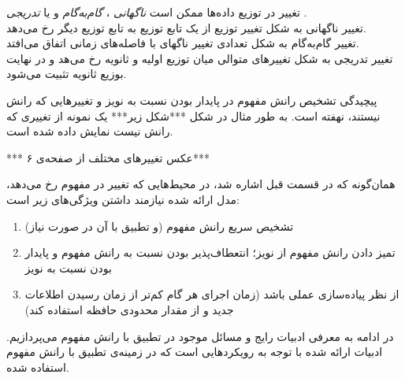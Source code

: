 تغییر در توزیع داده‌ها ممکن است 
\textit{
ناگهانی
}، 
\textit{
گام‌به‌گام
} 
و یا 
\textit{
تدریجی
}.\\
تغییر ناگهانی به شکل تغییر توزیع از یک تابع توزیع به تابع توزیع دیگر رخ می‌دهد.\\
تغییر گام‌به‌گام به شکل تعدادی تغییر ناگهای با فاصله‌های زمانی اتفاق می‌افتد.\\
تغییر تدریجی به شکل تغییرهای متوالی میان توزیع اولیه و ثانویه رخ می‌هد و در نهایت بوزیع ثانویه تثبیت می‌شود.

پیچیدگی تشخیص رانش مفهوم در پایدار بودن نسبت به نویز و تغییرهایی که رانش نیستند، نهفته است. به طور مثال در شکل ***شکل زیر*** یک نمونه از تغییری که رانش نیست نمایش داده شده است.

*** عکس تغییرهای مختلف از صفحه‌ی ۶***



همان‌گونه که در قسمت قبل اشاره شد، در محیط‌هایی که تغییر در مفهوم رخ می‌دهد، مدل ارائه شده نیازمند داشتن ویژگی‌های زیر است:
\begin{enumerate}
\item 
تشخیص سریع رانش مفهوم (و تطبیق با آن در صورت نیاز)

\item 
تمیز دادن رانش مفهوم از نویز؛ انتعطاف‌پذیر بودن نسبت به رانش مفهوم و پایدار بودن نسبت به نویز

\item 
از نظر پیاده‌سازی عملی باشد (زمان اجرای هر گام کم‌تر از زمان رسیدن اطلاعات جدید و از مقدار محدودی حافظه استفاده کند)

\end{enumerate}


در ادامه به معرفی ادبیات رایج و مسائل موجود در تطبیق با رانش مفهوم می‌پردازیم. ادبیات ارائه شده با توجه به رویکردهایی است که در زمینه‌ی تطبیق با رانش مفهوم استفاده شده.


